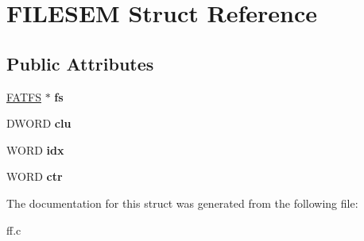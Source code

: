 \hypertarget{struct_f_i_l_e_s_e_m}{}\section{F\+I\+L\+E\+S\+EM Struct Reference}
\label{struct_f_i_l_e_s_e_m}
\subsection*{Public Attributes}
\begin{DoxyCompactItemize}
\item 
\mbox{\label{struct_f_i_l_e_s_e_m_a0c6a1d2307c6f595a47ceaeaebc80255}} 
\hyperlink{struct_f_a_t_f_s}{F\+A\+T\+FS} $\ast$ {\bfseries fs}
\item 
\mbox{\label{struct_f_i_l_e_s_e_m_a02edc835188d6af7c1b1bc52486a5d78}} 
D\+W\+O\+RD {\bfseries clu}
\item 
\mbox{\label{struct_f_i_l_e_s_e_m_aab093ab4a57ecd03566077ff890e2577}} 
W\+O\+RD {\bfseries idx}
\item 
\mbox{\label{struct_f_i_l_e_s_e_m_a2e5df477fb74015f09d62b0985871f1a}} 
W\+O\+RD {\bfseries ctr}
\end{DoxyCompactItemize}


The documentation for this struct was generated from the following file\+:\begin{DoxyCompactItemize}
\item 
ff.\+c\end{DoxyCompactItemize}
